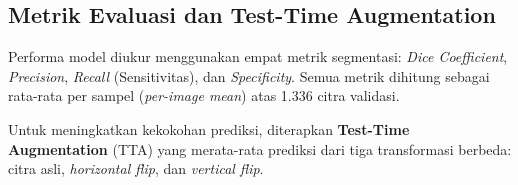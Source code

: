 \documentclass[12pt,a4paper,twocolumn]{article}
\begin{document}
\begin{table}[H]
  \centering
  \caption{Konfigurasi Pelatihan Model U-Net sCSE.}
  \label{tab:konfigurasi_pelatihan}
\end{table}

\subsection{Metrik Evaluasi dan Test-Time Augmentation}

Performa model diukur menggunakan empat metrik segmentasi: \textit{Dice
Coefficient}, \textit{Precision}, \textit{Recall} (Sensitivitas), dan
\textit{Specificity}. Semua metrik dihitung sebagai rata-rata per sampel
(\textit{per-image mean}) atas 1.336 citra validasi.

Untuk meningkatkan kekokohan prediksi, diterapkan \textbf{Test-Time
Augmentation} (TTA) yang merata-rata prediksi dari tiga transformasi berbeda:
citra asli, \textit{horizontal flip}, dan \textit{vertical flip}.
\end{document}
